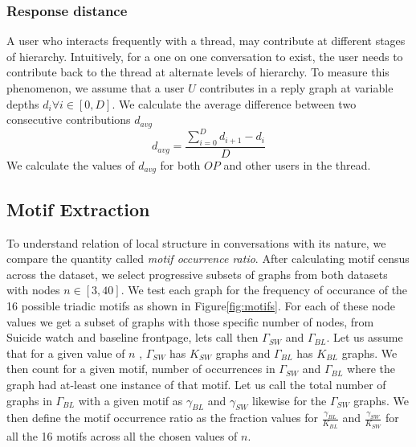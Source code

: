 \subsubsection{Response distance}
A user who interacts frequently with a thread, may contribute at different stages of hierarchy. Intuitively, for a one on one conversation to exist, the user needs to contribute back to the thread at alternate levels of hierarchy. To measure this phenomenon, we assume that a user $U$ contributes in a reply graph at variable depths $d_i \forall i \in [0,D]$. 
We calculate the average difference between two consecutive contributions $d_{avg}$
$$ d_{avg} = \frac{\sum_{i=0}^{D} d_{i+1} - d_i }{D}$$
We calculate the values of $d_{avg}$ for both $OP$ and other users in the thread.


\subsection{Motif Extraction}
To understand relation of local structure in conversations with its nature, we compare the quantity called \textsl{motif occurrence ratio}. After calculating motif census across the dataset\cite{Batagelj2001}, we select progressive subsets of graphs from both datasets with nodes $n \in [3 , 40]$.  We test each graph for the frequency of occurance of the 16 possible triadic motifs as shown in Figure\ref{fig:motifs}. For each of these node values we get a subset of graphs with those specific number of nodes, from Suicide watch and baseline frontpage, lets call then $\Gamma_{SW}$ and $\Gamma_{BL}$. Let us assume that for a given value of $n$ , $\Gamma_{SW}$ has $K_{SW}$ graphs and $\Gamma_{BL}$ has $K_{BL}$ graphs. We then count for a given motif, number of occurrences in $\Gamma_{SW}$ and $\Gamma_{BL}$ where the graph had at-least one instance of that motif. Let us call the total number of graphs in $\Gamma_{BL}$ with a given motif as $\gamma_{BL}$ and $\gamma_{SW}$ likewise for the $\Gamma_{SW}$ graphs. 
We then define the motif occurrence ratio as the fraction values for $\frac{\gamma_{BL}}{K_{BL}}$ and $\frac{\gamma_{SW}}{K_{SW}}$ for all the 16 motifs across all the chosen values of $n$. 


